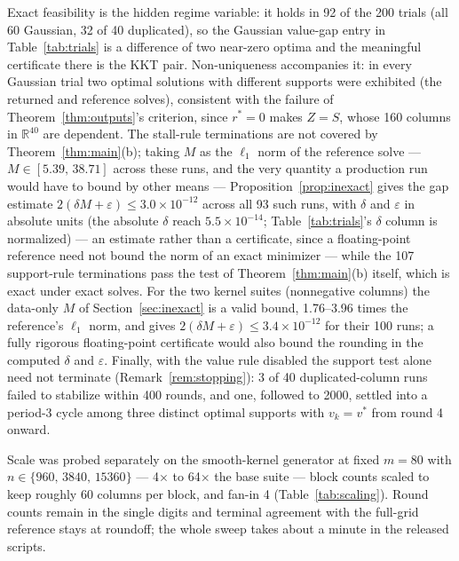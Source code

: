 \documentclass[pdflatex,sn-mathphys-num]{sn-jnl}
\theoremstyle{thmstyleone}
\theoremstyle{thmstyletwo}
\newcommand{\R}{\mathbb{R}}
\begin{document}
Exact feasibility is the hidden regime variable: it holds in 92 of
the 200 trials (all 60 Gaussian, 32 of 40 duplicated), so the
Gaussian value-gap entry in
Table~\ref{tab:trials} is a difference of two near-zero optima and the
meaningful certificate there is the KKT pair. Non-uniqueness
accompanies it: in every Gaussian trial two optimal solutions with
different supports were exhibited (the returned and reference solves),
consistent with the failure of Theorem~\ref{thm:outputs}'s criterion,
since $r^*=0$ makes $Z=S$, whose 160 columns in $\R^{40}$ are
dependent. The stall-rule terminations are not covered by
Theorem~\ref{thm:main}(b); taking $M$ as the $\ell_1$ norm of the
reference solve --- $M\in[5.39,\,38.71]$ across these runs, and the very
quantity a production run would have to bound by other means ---
Proposition~\ref{prop:inexact} gives the gap estimate
$2(\delta M+\varepsilon)\le3.0\times10^{-12}$ across all 93 such runs,
with $\delta$ and $\varepsilon$ in absolute units (the absolute
$\delta$ reach $5.5\times10^{-14}$; Table~\ref{tab:trials}'s $\delta$
column is normalized) --- an estimate rather than a certificate, since
a floating-point reference need not bound the norm of an exact
minimizer --- while the 107 support-rule terminations pass the test of
Theorem~\ref{thm:main}(b) itself, which is exact under exact solves.
For the two kernel suites (nonnegative columns) the data-only $M$ of
Section~\ref{sec:inexact} is a valid bound, 1.76--3.96 times the
reference's $\ell_1$ norm, and gives
$2(\delta M+\varepsilon)\le3.4\times10^{-12}$ for their 100 runs; a
fully rigorous floating-point certificate would also bound the rounding
in the computed $\delta$ and $\varepsilon$. Finally,
with the value rule disabled the support test alone need not
terminate (Remark~\ref{rem:stopping}): 3 of 40 duplicated-column runs
failed to stabilize within 400 rounds, and one, followed to 2000,
settled into a period-3 cycle among three distinct optimal supports
with $v_k=v^*$ from round 4 onward.

Scale was probed separately on the smooth-kernel generator at fixed
$m=80$ with $n\in\{960,\,3840,\,15360\}$ --- 4$\times$ to 64$\times$
the base suite --- block counts scaled to keep roughly 60 columns per
block, and fan-in 4 (Table~\ref{tab:scaling}). Round counts remain in
the single digits and terminal agreement with the full-grid reference
stays at roundoff; the whole sweep takes about a minute in the
released scripts.
\end{document}
